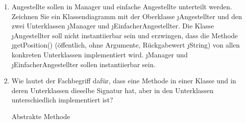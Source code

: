 \documentclass{bschlangaul-aufgabe}
\begin{document}
\begin{enumerate}

\item Angestellte sollen in Manager und einfache Angestellte unterteilt
werden. Zeichnen Sie ein Klassendiagramm mit der Oberklasse
\j{Angestellter} und den zwei Unterklassen \j{Manager}
und \j{EinfacherAngestellter}. Die Klasse
\j{Angestellter} soll nicht instantiierbar sein und erzwingen,
dass die Methode \j{getPosition()} (öffentlich, ohne Argumente,
Rückgabewert \j{String}) von allen konkreten Unterklassen
implementiert wird. \j{Manager} und
\j{EinfacherAngestellter} sollen instantiierbar sein.

\begin{bAntwort}
\begin{center}
\end{center}
\end{bAntwort}


\item Wie lautet der Fachbegriff dafür, dass eine Methode in einer
Klasse und in deren Unterklassen dieselbe Signatur hat, aber in den
Unterklassen unterschiedlich implementiert ist?

\begin{bAntwort}
Abstrakte Methode
\end{bAntwort}
\end{enumerate}
\end{document}
